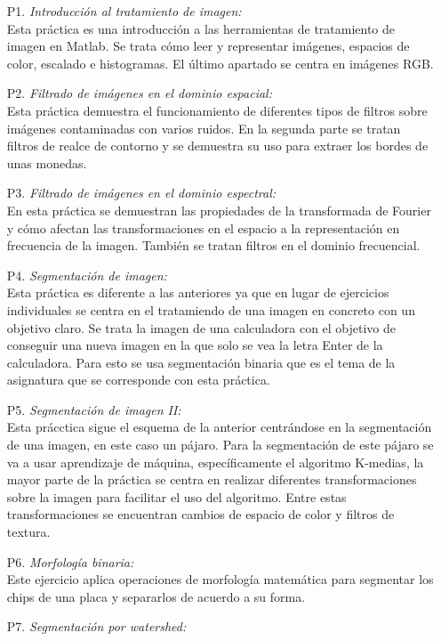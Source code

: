 \begin{itemize}
  \item [ P1.]\emph{Introducción al tratamiento de imagen:}\\
	Esta práctica es una introducción a las herramientas de tratamiento de imagen en Matlab. Se trata cómo leer y representar imágenes, espacios de color, escalado e histogramas. El último apartado se centra en imágenes RGB.
  \item [P2.]\emph{ Filtrado de imágenes en el dominio espacial:}\\
	Esta práctica demuestra el funcionamiento de diferentes tipos de filtros sobre imágenes contaminadas con varios ruidos. En la segunda parte se tratan filtros de realce de contorno y se demuestra su uso para extraer los bordes de unas monedas.
  \item [P3.]\emph{Filtrado de imágenes en el dominio espectral:}\\
	En esta práctica se demuestran las propiedades de la transformada de Fourier y cómo afectan las transformaciones en el espacio a la representación en frecuencia de la imagen. También se tratan filtros en el dominio frecuencial.
  \item [P4.]\emph{Segmentación de imagen:}\\
	Esta práctica es diferente a las anteriores ya que en lugar de ejercicios individuales se centra en el tratamiendo de una imagen en concreto con un objetivo claro. Se trata  la imagen de una calculadora con el objetivo de conseguir una nueva imagen en la que solo se vea la letra Enter de la calculadora. Para esto se usa segmentación binaria que es el tema de la asignatura que se corresponde con esta práctica.
  \item [P5.]\emph{Segmentación de imagen II:}\\
	Esta prácctica sigue el esquema de la anterior centrándose en la segmentación de una imagen, en este caso un pájaro. Para la segmentación de este pájaro se va a usar aprendizaje de máquina, específicamente el algoritmo K-medias, la mayor parte de la práctica se centra en realizar diferentes transformaciones sobre la imagen para facilitar el uso del algoritmo. Entre estas transformaciones se encuentran cambios de espacio de color y filtros de textura.
  \item [P6.]\emph{Morfología binaria:}\\
	Este ejercicio aplica operaciones de morfología matemática para segmentar los chips de una placa y separarlos de acuerdo a su forma.
  \item [P7.]\emph{Segmentación por watershed:}\\

\end{itemize}
